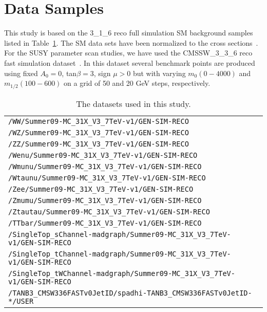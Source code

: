 \section{Data Samples}
\label{sec:datasamples}
This study is based on the 3\_1\_6 reco full simulation SM background samples
listed in Table~\ref{tab:datasets}.  The SM data sets have been normalized 
to the cross sections~\cite{mcsusy}. For the SUSY parameter scan studies, we have used  
the CMSSW\_3\_3\_6 reco fast simulation dataset~\cite{fast10}. In this dataset several benchmark 
points are produced using fixed $A_0 = 0 $, tan$\beta = 3$, sign $\mu > 0 $ but with varying 
$m_{0} (0 - 4000)$ and $m_{1/2} (100 - 600)$ on a grid of 50 and 20 GeV steps, respectively.

\begin{table}[hbt]
\begin{center}
\begin{tabular}{|l|}\hline
{\tt /WW/Summer09-MC\_31X\_V3\_7TeV-v1/GEN-SIM-RECO} \\
{\tt /WZ/Summer09-MC\_31X\_V3\_7TeV-v1/GEN-SIM-RECO} \\
{\tt /ZZ/Summer09-MC\_31X\_V3\_7TeV-v1/GEN-SIM-RECO} \\
{\tt /Wenu/Summer09-MC\_31X\_V3\_7TeV-v1/GEN-SIM-RECO} \\
{\tt /Wmunu/Summer09-MC\_31X\_V3\_7TeV-v1/GEN-SIM-RECO} \\
{\tt /Wtaunu/Summer09-MC\_31X\_V3\_7TeV-v1/GEN-SIM-RECO} \\
{\tt /Zee/Summer09-MC\_31X\_V3\_7TeV-v1/GEN-SIM-RECO} \\
{\tt /Zmumu/Summer09-MC\_31X\_V3\_7TeV-v1/GEN-SIM-RECO} \\
{\tt /Ztautau/Summer09-MC\_31X\_V3\_7TeV-v1/GEN-SIM-RECO} \\
{\tt /TTbar/Summer09-MC\_31X\_V3\_7TeV-v1/GEN-SIM-RECO} \\
{\tt /SingleTop\_sChannel-madgraph/Summer09-MC\_31X\_V3\_7TeV-v1/GEN-SIM-RECO} \\
{\tt /SingleTop\_tChannel-madgraph/Summer09-MC\_31X\_V3\_7TeV-v1/GEN-SIM-RECO} \\
{\tt /SingleTop\_tWChannel-madgraph/Summer09-MC\_31X\_V3\_7TeV-v1/GEN-SIM-RECO} \\
{\tt /TANB3\_CMSW336FASTv0JetID/spadhi-TANB3\_CMSW336FASTv0JetID-*/USER} \\
\hline
\end{tabular}
\caption{The datasets used in this study.\label{tab:datasets}}
\end{center}
\end{table}

